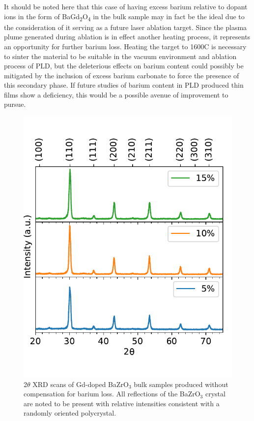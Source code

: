 It should be noted here that this case of having excess barium relative to dopant ions in the form of BaGd\textsubscript{2}O\textsubscript{4} in the bulk sample may in fact be the ideal due to the consideration of it serving as a future laser ablation target. Since the plasma plume generated during ablation is in effect another heating process, it represents an opportunity for further barium loss. Heating the target to 1600\textdegree C is necessary to sinter the material to be suitable in the vacuum environment and ablation process of PLD, but the deleterious effects on barium content could possibly be mitigated by the inclusion of excess barium carbonate to force the presence of this secondary phase. If future studies of barium content in PLD produced thin films show a deficiency, this would be a possible avenue of improvement to pursue.
\begin{figure}
    \centering
    \includegraphics{Figures/150407-xrd-1stgen-dopant-concentration.pdf}
    \caption{2$\theta$ XRD scans of Gd-doped BaZrO$_3$ bulk samples produced without compensation for barium loss. All reflections of the BaZrO$_3$ crystal are noted to be present with relative intensities consistent with a randomly oriented polycrystal.}
    \label{fig:target:xrd:bariumCompensationComparison}
\end{figure}
